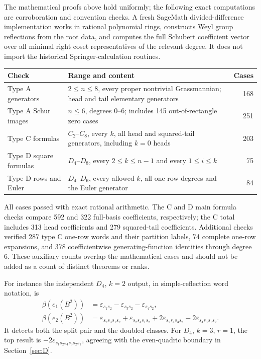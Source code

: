 \documentclass[11pt,letterpaper]{article}
\theoremstyle{remark}
\newcommand{\eps}{\varepsilon}
\begin{document}
The mathematical proofs above hold uniformly; the following exact computations are corroboration and convention checks. A fresh SageMath divided-difference implementation works in rational polynomial rings, constructs Weyl group reflections from the root data, and computes the full Schubert coefficient vector over all minimal right coset representatives of the relevant degree. It does not import the historical Springer-calculation routines.

\begin{center}
\small
\begin{tabular}{@{}p{}p{}r@{}}
\toprule
Check & Range and content & Cases\\
\midrule
Type A generators & $2\leq n\leq8$, every proper nontrivial Grassmannian; head and tail elementary generators &168\\[3pt]
Type A Schur images & $n\leq6$, degrees $0$--$6$; includes 145 out-of-rectangle zero cases &251\\[3pt]
Type C formulas & $C_2$--$C_8$, every $k$, all head and squared-tail generators, including $k=0$ heads &203\\[3pt]
Type D square formulas & $D_4$--$D_8$, every $2\leq k\leq n-1$ and every $1\leq i\leq k$ &75\\[3pt]
Type D rows and Euler & $D_4$--$D_6$, every allowed $k$, all one-row degrees and the Euler generator &84\\
\bottomrule
\end{tabular}
\end{center}

All cases passed with exact rational arithmetic. The C and D main formula checks compare 592 and 322 full-basis coefficients, respectively; the C total includes 313 head coefficients and 279 squared-tail coefficients. Additional checks verified 287 type C one-row words and their partition labels, 74 complete one-row expansions, and 378 coefficientwise generating-function identities through degree 6. These auxiliary counts overlap the mathematical cases and should not be added as a count of distinct theorems or ranks.

For instance the independent $D_4$, $k=2$ output, in simple-reflection word notation, is
\begin{align*}
 \beta(e_1(B^2))&=\eps_{s_1s_2}-\eps_{s_3s_2}-\eps_{s_4s_2},\\
 \beta(e_2(B^2))&=\eps_{s_2s_3s_1s_2}+\eps_{s_2s_4s_1s_2}
       +2\eps_{s_2s_4s_3s_2}-2\eps_{s_4s_3s_1s_2}.
\end{align*}
It detects both the split pair and the doubled classes. For $D_4$, $k=3$, $r=1$, the top result is $-2\eps_{s_1s_2s_4s_3s_2s_1}$, agreeing with the even-quadric boundary in Section~\ref{sec:D}.
\end{document}
